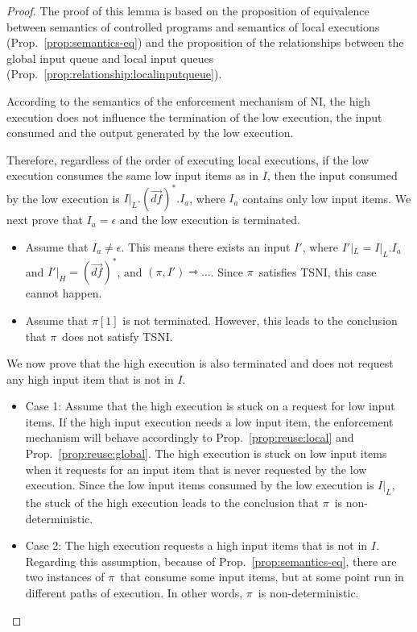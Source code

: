 \documentclass[10pt,a4paper,oneside]{article}
\def\executionnt#1#2{\ensuremath{(#1, #2) \rightarrowtriangle \dots}}
\def\defseq#1{\ensuremath{#1 = (\defvec)^*}}
\def\emptyQ{\ensuremath{\epsilon}}
\def\defvec{\ensuremath{\vec{df}}}
\def\Prog{\ensuremath{\pi}}
\def\Progl#1{\ensuremath{\Prog[#1]}}
\begin{document}
\begin{proof}
The proof of this lemma is based on the proposition of equivalence between semantics of controlled programs and semantics of local executions (Prop.~\ref{prop:semantics-eq}) and the proposition of the relationships between the global input queue and local input queues (Prop.~\ref{prop:relationship:localinputqueue}).

According to the semantics of the enforcement mechanism of NI, the high execution does not influence the termination of the low execution, the input consumed and the output generated by the low execution.

Therefore, regardless of the order of executing local executions, if the low execution consumes the same low input items as in $I$, then the input consumed by the low execution is $I|_L.(\defvec)^*.I_a$, where $I_a$ contains only low input items. We next prove that $I_a =\emptyQ$ and the low execution is terminated.

\begin{itemize}
\item Assume that $I_a \neq \emptyQ$. This means there exists an input $I'$, where $I'|_L = I|_L.I_a$ and \defseq{I'|_H}, and \executionnt{\Prog}{I'}. Since \Prog\ satisfies TSNI, this case cannot happen.

\item Assume that \Progl{1} is not terminated. However, this leads to the conclusion that \Prog\ does not satisfy TSNI.
\end{itemize}

We now prove that the high execution is also terminated and does not request any high input item that is not in $I$. \begin{itemize}
    \item Case 1: Assume that the high execution is stuck on a request for low input items. If the high input execution needs a low input item, the enforcement mechanism will behave accordingly to Prop.~\ref{prop:reuse:local} and Prop.~\ref{prop:reuse:global}. The high execution is stuck on low input items when it requests for an input item that is never requested by the low execution. Since the low input items consumed by the low execution is $I|_L$, the stuck of the high execution leads to the conclusion that \Prog\ is non-deterministic.

	\item Case 2: The high execution requests a high input items that is not in $I$. Regarding this assumption, because of Prop.~\ref{prop:semantics-eq}, there are two instances of \Prog\ that consume some input items, but at some point run in different paths of execution. In other words, \Prog\ is non-deterministic.


\end{itemize}
\end{proof}
\end{document}
